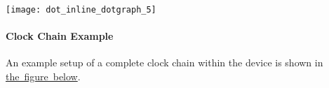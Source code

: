 \begin{DoxyImageNoCaption}
  \mbox{\texttt{[image: dot\_inline\_dotgraph\_5]}}
\end{DoxyImageNoCaption}
\hypertarget{group__asfdoc__sam0__system__clock__group_asfdoc_sam0_system_clock_module_chain_example}{}\paragraph{Clock Chain Example}\label{group__asfdoc__sam0__system__clock__group_asfdoc_sam0_system_clock_module_chain_example}
An example setup of a complete clock chain within the device is shown in \mbox{\hyperlink{group__asfdoc__sam0__system__clock__group_asfdoc_sam0_system_clock_module_chain_example_fig}{the figure below}}.

\label{group__asfdoc__sam0__system__clock__group_asfdoc_sam0_system_clock_module_chain_example_fig}%
%

